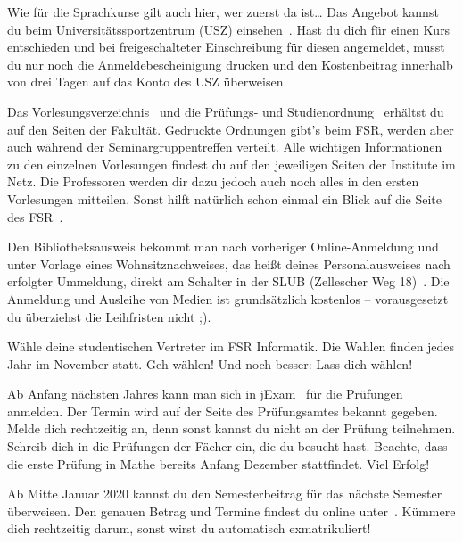 \begin{itemize}[leftmargin=*]
Wie für die Sprachkurse gilt auch hier, wer zuerst da ist\ldots{} Das Angebot
kannst du beim Universitätssportzentrum (USZ) einsehen~. Hast du dich für einen Kurs entschieden und
bei freigeschalteter Einschreibung für diesen angemeldet, musst du nur noch die
Anmeldebescheinigung drucken und den Kostenbeitrag innerhalb von drei Tagen auf
das Konto des USZ überweisen.

Das Vorlesungsverzeichnis~ und die Prüfungs- und
Studienordnung~ erhältst du
auf den Seiten der Fakultät. Gedruckte Ordnungen gibt's beim FSR, werden aber auch während der Seminargruppentreffen verteilt.
Alle wichtigen Informationen zu den einzelnen Vorlesungen findest du
auf den jeweiligen Seiten der Institute im Netz.  Die Professoren werden dir
dazu jedoch auch noch alles in den ersten Vorlesungen mitteilen. Sonst hilft
natürlich schon einmal ein Blick auf die Seite des FSR~.

Den Bibliotheksausweis bekommt man nach vorheriger Online-Anmeldung und unter Vorlage eines
Wohnsitznachweises, das heißt deines Personalausweises nach erfolgter Ummeldung,
direkt am Schalter in der SLUB (Zellescher Weg 18)~. Die Anmeldung und Ausleihe
von Medien ist grundsätzlich kostenlos -- vorausgesetzt du überziehst die
Leihfristen nicht ;).

Wähle deine studentischen Vertreter im FSR Informatik. Die Wahlen finden jedes
Jahr im November statt. Geh wählen! Und noch besser: Lass dich wählen!


Ab Anfang nächsten Jahres kann man sich in jExam~ für die Prüfungen anmelden.
Der Termin wird auf der Seite des Prüfungsamtes bekannt gegeben. Melde dich
rechtzeitig an, denn sonst kannst du nicht an der Prüfung teilnehmen. Schreib
dich in die Prüfungen der Fächer ein, die du besucht hast. Beachte, dass die
erste Prüfung in Mathe bereits Anfang Dezember stattfindet. Viel Erfolg!

Ab Mitte Januar 2020 kannst du den Semesterbeitrag für das nächste Semester
überweisen. Den genauen Betrag und Termine findest du online unter~. Kümmere dich rechtzeitig darum,
sonst wirst du automatisch exmatrikuliert!

\end{itemize}

